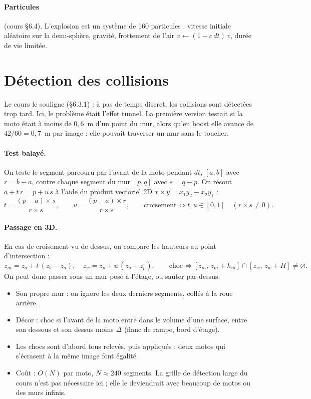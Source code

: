 \documentclass[11pt,a4paper]{article}
\begin{document}
\paragraph{Particules} (cours §6.4). L'explosion est un système de 160 particules : vitesse initiale aléatoire sur la demi-sphère, gravité, frottement de l'air $v \leftarrow (1 - c\,dt)\,v$, durée de vie limitée.

\section{Détection des collisions}

Le cours le souligne (§6.3.1) : à pas de temps discret, les collisions sont détectées trop tard. Ici, le problème était l'effet tunnel. La première version testait si la moto était à moins de $0{,}6$~m d'un point du mur, alors qu'en boost elle avance de $42/60 = 0{,}7$~m par image : elle pouvait traverser un mur sans le toucher.

\paragraph{Test balayé.} On teste le segment parcouru par l'avant de la moto pendant $dt$, $[a, b]$ avec $r = b - a$, contre chaque segment du mur $[p, q]$ avec $s = q - p$. On résout $a + t\,r = p + u\,s$ à l'aide du produit vectoriel 2D $x \times y = x_1 y_2 - x_2 y_1$ :
\[
	t = \frac{(p - a)\times s}{r \times s}, \qquad u = \frac{(p - a)\times r}{r \times s}, \qquad \text{croisement} \iff t, u \in [0, 1] \quad (r\times s \neq 0).
\]
\paragraph{Passage en 3D.} En cas de croisement vu de dessus, on compare les hauteurs au point d'intersection :
\[
	z_m = z_a + t\,(z_b - z_a), \quad z_w = z_p + u\,(z_q - z_p), \qquad
	\text{choc} \iff [z_m,\, z_m + h_m] \cap [z_w,\, z_w + H] \neq \varnothing.
\]
On peut donc passer sous un mur posé à l'étage, ou sauter par-dessus.
\begin{itemize}
	\item Son propre mur : on ignore les deux derniers segments, collés à la roue arrière.
	\item Décor : choc si l'avant de la moto entre dans le volume d'une surface, entre son dessous et son dessus moins $\Delta$ (flanc de rampe, bord d'étage).
	\item Les chocs sont d'abord tous relevés, puis appliqués : deux motos qui s'écrasent à la même image font égalité.
	\item Coût : $O(N)$ par moto, $N \approx 240$ segments. La grille de détection large du cours n'est pas nécessaire ici ; elle le deviendrait avec beaucoup de motos ou des murs infinis.
\end{itemize}
\end{document}
